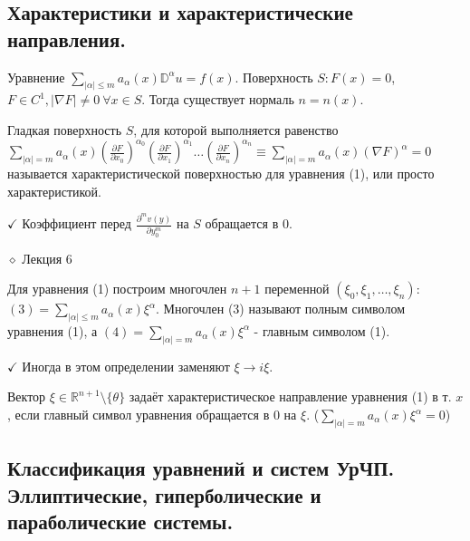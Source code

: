 \documentclass{article}
\begin{document}
\subsection{Характеристики и характеристические направления.}
Уравнение $\sum_{|\alpha| \le m} a_{\alpha}(x)\mathbb{D}^{\alpha}u = f(x)$.
Поверхность $S :F(x)=0$, $F \in C^1, |\nabla F| \ne 0 \ \forall x \in S$.
Тогда существует нормаль $n=n(x)$.

\begin{definition}
Гладкая поверхность $S$, для которой выполняется равенство $\sum_{|\alpha|= m}a_{\alpha}(x)(\frac{\partial F}{\partial x_0})^{\alpha_0}(\frac{\partial F}{\partial x_1})^{\alpha_1}\dots(\frac{\partial F}{\partial x_n})^{\alpha_n} \equiv \sum_{|\alpha|=m} a_{\alpha}(x)(\nabla F)^{\alpha} = 0$ называется характеристической поверхностью для уравнения (1), или просто характеристикой. \\
\end{definition}
$\checkmark$ Коэффициент перед $\frac{\partial^m v(y)}{\partial y_0^m}$ на $S$ обращается в 0. \\
\vspace{14}

$\diamond$ Лекция 6 \\

\begin{definition}
Для уравнения (1) построим многочлен $n+1$ переменной $(\xi_0, \xi_1, \dots, \xi_n)$: $(3) = \sum_{|\alpha| \le m}a_{\alpha}(x)\xi^{\alpha}$. Многочлен (3) называют полным символом уравнения (1), а $(4) = \sum_{|\alpha| = m}a_{\alpha}(x)\xi^{\alpha}$ - главным символом (1).
\end{definition}
$\checkmark$ Иногда в этом определении заменяют $\xi \to i\xi$.
\begin{definition}
Вектор $\xi \in \mathbb{R}^{n+1} \setminus \{\theta\}$ задаёт характеристическое направление уравнения (1) в т. $x$, если главный символ уравнения обращается в 0 на $\xi$. ($\sum_{|\alpha|=m} a_{\alpha}(x)\xi^{\alpha} = 0$)
\end{definition}


\subsection{Классификация уравнений и систем УрЧП. Эллиптические, гиперболические и параболические системы.}
\end{document}
